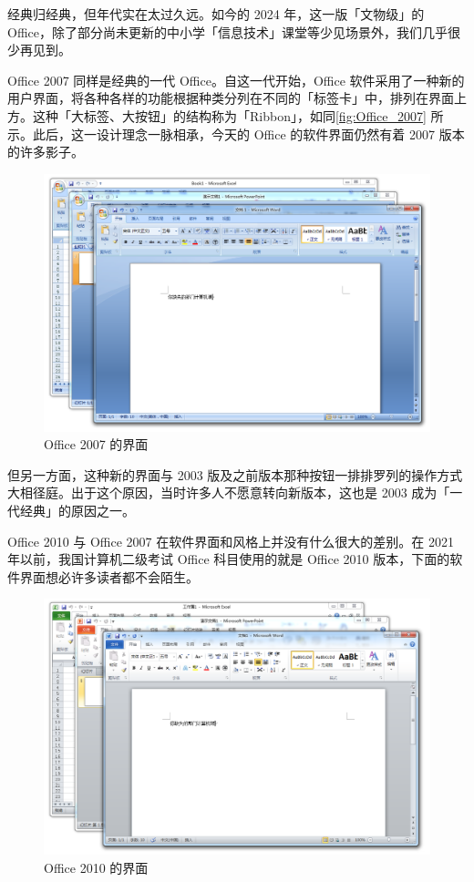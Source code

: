经典归经典，但年代实在太过久远。如今的 2024 年，这一版「文物级」的 Office，除了部分尚未更新的中小学「信息技术」课堂等少见场景外，我们几乎很少再见到。

Office 2007 同样是经典的一代 Office。自这一代开始，Office 软件采用了一种新的用户界面，将各种各样的功能根据种类分列在不同的「标签卡」中，排列在界面上方。这种「大标签、大按钮」的结构称为「Ribbon」，如同\autoref{fig:Office_2007} 所示。此后，这一设计理念一脉相承，今天的 Office 的软件界面仍然有着 2007 版本的许多影子。

\begin{figure}[htb!]
  \centering
  \includegraphics[width=.81\textwidth]{assets/software/Office_2007.png}
  \caption{Office 2007 的界面}
  \label{fig:Office_2007}
\end{figure}

但另一方面，这种新的界面与 2003 版及之前版本那种按钮一排排罗列的操作方式大相径庭。出于这个原因，当时许多人不愿意转向新版本，这也是 2003 成为「一代经典」的原因之一。

Office 2010 与 Office 2007 在软件界面和风格上并没有什么很大的差别。在 2021 年以前，我国计算机二级考试 Office 科目使用的就是 Office 2010 版本，下面的软件界面想必许多读者都不会陌生。

\begin{figure}[htb!]
  \centering
  \includegraphics[width=.81\textwidth]{assets/software/Office_2010.png}
  \caption{Office 2010 的界面}
  \label{fig:Office_2010}
\end{figure}


